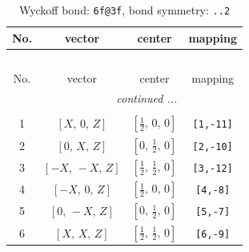 \documentclass[fleqn,8pt]{jsarticle}
\begin{document}
\begin{longtable}{cccc}
\caption{Wyckoff bond: {\tt 6f@3f}, bond symmetry: {\tt ..2}}
 \\
 \hline \hline
No. & vector & center & mapping \\ \hline \endfirsthead

\multicolumn{3}{l}{\tablename\ \thetable{}} \\
 \hline \hline
No. & vector & center & mapping \\ \hline \endhead

 \hline \hline
\multicolumn{3}{r}{\footnotesize\it continued ...} \\ \endfoot

 \hline \hline
\multicolumn{3}{r}{} \\ \endlastfoot

1 & $\left[ X,\, 0,\, Z \right]$ & $\left[ \frac{1}{2},\, 0,\, 0 \right]$ & {\tt [1,-11]} \\ \hline
2 & $\left[ 0,\, X,\, Z \right]$ & $\left[ 0,\, \frac{1}{2},\, 0 \right]$ & {\tt [2,-10]} \\ \hline
3 & $\left[ - X,\, - X,\, Z \right]$ & $\left[ \frac{1}{2},\, \frac{1}{2},\, 0 \right]$ & {\tt [3,-12]} \\ \hline
4 & $\left[ - X,\, 0,\, Z \right]$ & $\left[ \frac{1}{2},\, 0,\, 0 \right]$ & {\tt [4,-8]} \\ \hline
5 & $\left[ 0,\, - X,\, Z \right]$ & $\left[ 0,\, \frac{1}{2},\, 0 \right]$ & {\tt [5,-7]} \\ \hline
6 & $\left[ X,\, X,\, Z \right]$ & $\left[ \frac{1}{2},\, \frac{1}{2},\, 0 \right]$ & {\tt [6,-9]} \\
\end{longtable}
\renewcommand{\arraystretch}{1.2}
\end{document}

